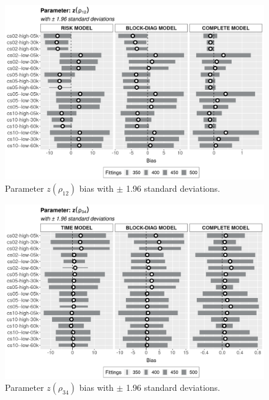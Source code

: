 \documentclass[a4paper,12pt]{article}
\begin{document}
\begin{figure}[H]
 \centering
 \includegraphics[width=\linewidth]{../../THESIS/thesis/figures/bias2plotsd-11.png}
 \vspace{-0.75cm}
 \caption{Parameter \(z(\rho_{12})\) bias with \(\pm\) 1.96 standard
   deviations.}
 \label{fig:biassdrhoz12}
\end{figure}

\begin{figure}[H]
 \centering
 \includegraphics[width=\linewidth]{../../THESIS/thesis/figures/bias2plotsd-12.png}
 \vspace{-0.75cm}
 \caption{Parameter \(z(\rho_{34})\) bias with \(\pm\) 1.96 standard
   deviations.}
 \label{fig:biassdrhoz34}
\end{figure}
\end{document}
